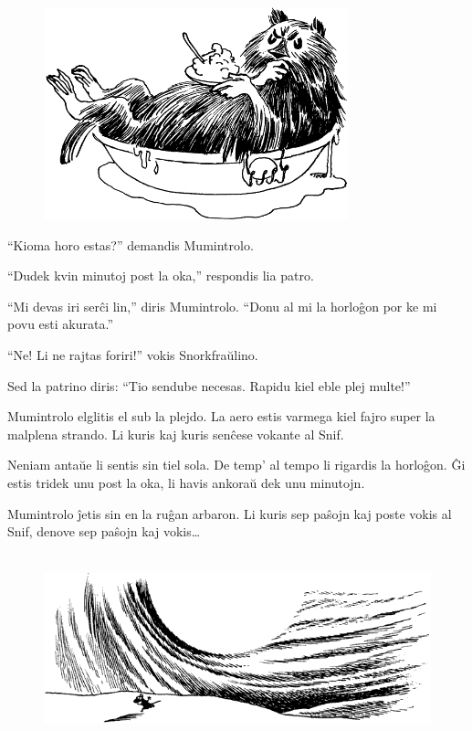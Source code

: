 \begin{figure}[htbp]
\centering
\includegraphics[width=250pt,height=174pt]{9-8.png}
\caption{}
\label{9-8}
\end{figure}

``Kioma horo estas?'' demandis Mumintrolo.

``Dudek kvin minutoj post la oka,'' respondis lia patro.

``Mi devas iri serĉi lin,'' diris Mumintrolo. ``Donu al mi la horloĝon por ke mi povu esti akurata.''

``Ne! Li ne rajtas foriri!'' vokis Snorkfraŭlino.

Sed la patrino diris: ``Tio sendube necesas. Rapidu kiel eble plej multe!''

Mumintrolo elglitis el sub la plejdo. La aero estis varmega kiel fajro super la malplena strando. Li kuris kaj kuris senĉese vokante al Snif.

Neniam antaŭe li sentis sin tiel sola. De temp' al tempo li rigardis la horloĝon. Ĝi estis tridek unu post la oka, li havis ankoraŭ dek unu minutojn.

Mumintrolo ĵetis sin en la ruĝan arbaron. Li kuris sep paŝojn kaj poste vokis al Snif, denove sep paŝojn kaj vokis{\ldots}

\begin{figure}[htbp]
\centering
\includegraphics[width=400pt,height=156pt]{9-9.png}
\caption{}
\label{9-9}
\end{figure}

